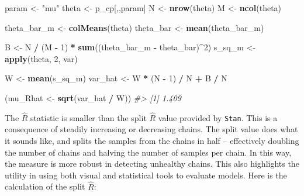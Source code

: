 \documentclass[11pt, oneside, openany]{scrbook}
\newenvironment{Shaded}{\begin{snugshade}}{\end{snugshade}}
\newcommand{\CommentTok}[1]{\textcolor[rgb]{0.56,0.35,0.01}{\textit{#1}}}
\newcommand{\DecValTok}[1]{\textcolor[rgb]{0.00,0.00,0.81}{#1}}
\newcommand{\KeywordTok}[1]{\textcolor[rgb]{0.13,0.29,0.53}{\textbf{#1}}}
\newcommand{\NormalTok}[1]{#1}
\newcommand{\OperatorTok}[1]{\textcolor[rgb]{0.81,0.36,0.00}{\textbf{#1}}}
\newcommand{\StringTok}[1]{\textcolor[rgb]{0.31,0.60,0.02}{#1}}
\begin{document}
\begin{Shaded}
\begin{Highlighting}[]
\NormalTok{param <-}\StringTok{ "mu"}
\NormalTok{theta <-}\StringTok{ }\NormalTok{p_cp[,,param]}
\NormalTok{N     <-}\StringTok{ }\KeywordTok{nrow}\NormalTok{(theta)}
\NormalTok{M     <-}\StringTok{ }\KeywordTok{ncol}\NormalTok{(theta)}

\NormalTok{theta_bar_m <-}\StringTok{ }\KeywordTok{colMeans}\NormalTok{(theta)}
\NormalTok{theta_bar   <-}\StringTok{ }\KeywordTok{mean}\NormalTok{(theta_bar_m)}

\NormalTok{B <-}\StringTok{ }\NormalTok{N }\OperatorTok{/}\StringTok{ }\NormalTok{(M }\OperatorTok{-}\StringTok{ }\DecValTok{1}\NormalTok{) }\OperatorTok{*}\StringTok{ }\KeywordTok{sum}\NormalTok{((theta_bar_m }\OperatorTok{-}\StringTok{ }\NormalTok{theta_bar)}\OperatorTok{^}\DecValTok{2}\NormalTok{)}
\NormalTok{s_sq_m <-}\StringTok{ }\KeywordTok{apply}\NormalTok{(theta, }\DecValTok{2}\NormalTok{, var)}

\NormalTok{W <-}\StringTok{ }\KeywordTok{mean}\NormalTok{(s_sq_m)}
\NormalTok{var_hat <-}\StringTok{ }\NormalTok{W }\OperatorTok{*}\StringTok{ }\NormalTok{(N }\OperatorTok{-}\StringTok{ }\DecValTok{1}\NormalTok{) }\OperatorTok{/}\StringTok{ }\NormalTok{N }\OperatorTok{+}\StringTok{ }\NormalTok{B }\OperatorTok{/}\StringTok{ }\NormalTok{N}

\NormalTok{(mu_Rhat <-}\StringTok{ }\KeywordTok{sqrt}\NormalTok{(var_hat }\OperatorTok{/}\StringTok{ }\NormalTok{W))}
\CommentTok{#> [1] 1.409}
\end{Highlighting}
\end{Shaded}


The \(\hat{R}\) statistic is smaller than the split \(\hat{R}\) value provided by \texttt{Stan}. This is a consequence of steadily increasing or decreasing chains. The split value does what it sounds like, and splits the samples from the chains in half -- effectively doubling the number of chains and halving the number of samples per chain. In this way, the measure is more robust in detecting unhealthy chains. This also highlights the utility in using both visual and statistical tools to evaluate models. Here is the calculation of the split \(\hat{R}\):

\end{document}
